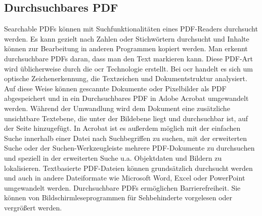 \subsection{Durchsuchbares PDF}
Searchable PDFs können mit Suchfunktionalitäten eines PDF-Readers durchsucht werden. Es kann gezielt nach Zahlen oder Stichwörtern durchsucht und Inhalte können zur Bearbeitung in anderen Programmen kopiert werden. Man erkennt durchsuchbare PDFs daran, dass man den Text markieren kann. Diese PDF-Art wird üblicherweise durch die \gls{ocr} Technologie erstellt. Bei \gls{ocr} handelt es sich um optische Zeichenerkennung, die Textzeichen und Dokumentstruktur analysiert. Auf diese Weise können gescannte Dokumente oder Pixelbilder als PDF abgespeichert und in ein Durchsuchbares PDF in Adobe Acrobat umgewandelt werden. Während der Umwandlung wird dem Dokument eine zusätzliche unsichtbare Textebene, die unter der Bildebene liegt und durchsuchbar ist, auf der Seite hinzugefügt. In Acrobat ist es außerdem möglich mit der einfachen Suche innerhalb einer Datei nach Suchbegriffen zu suchen, mit der erweiterten Suche oder der Suchen-Werkzeugleiste mehrere PDF-Dokumente zu durchsuchen und speziell in der erweiterten Suche u.a. Objektdaten und Bildern zu lokalisieren. Textbasierte PDF-Dateien können grundsätzlich durchsucht werden und auch in andere Dateiformate wie Microsoft Word, Excel oder PowerPoint umgewandelt werden. Durchsuchbare PDFs ermöglichen Barrierefreiheit. Sie können von Bildschirmleseprogrammen für Sehbehinderte vorgelesen oder vergrößert werden. 
\cite{adobe-search}




